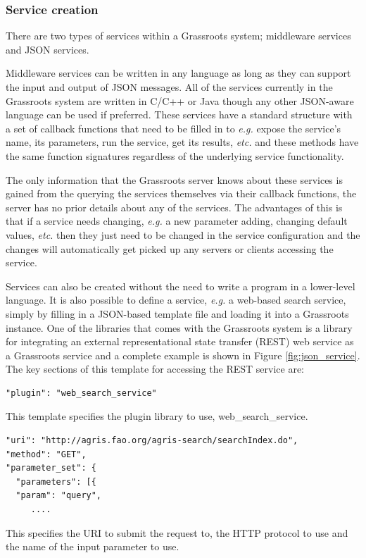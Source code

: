 \documentclass[12pt,a4paper]{extarticle}
\begin{document}
\subsubsection*{Service creation}

There are two types of services within a Grassroots system; middleware services and JSON services.

Middleware services can be written in any language as long as they can support the input and output of JSON messages. 
All of the services currently in the Grassroots system are written in C/C++ or Java though any other JSON-aware language can be used if preferred. 
These services have a standard structure with a set of callback functions that need to be filled in to \textit{e.g.} expose the service's name, its parameters, run the service, get its results, \textit{etc.} and these methods have the same function signatures regardless of the underlying service functionality. 

The only information that the Grassroots server knows about these services is gained from the querying the services themselves via their callback functions, the server has no prior details about any of the services. 
The advantages of this is that if a service needs changing, \textit{e.g.} a new parameter adding, changing default values, \textit{etc.} then they just need to be changed in the service configuration and the changes will automatically get picked up any servers or clients accessing the service. 

Services can also be created without the need to write a program in a lower-level language. 
It is also possible to define a service, \textit{e.g.} a web-based search service, simply by filling in a JSON-based template file and loading it into a Grassroots instance. 
One of the libraries that comes with the Grassroots system is a library for integrating an external representational state transfer (REST) web service as a Grassroots service and a complete example is shown in Figure \ref{fig:json_service}. 
The key sections of this template for accessing the REST service are:

\begin{lstlisting}[style=json]
"plugin": "web_search_service"
\end{lstlisting}
This template specifies the plugin library to use, web\_search\_service.

\begin{lstlisting}[style=json]
"uri": "http://agris.fao.org/agris-search/searchIndex.do",
"method": "GET",
"parameter_set": {
  "parameters": [{
  "param": "query",
     ....
\end{lstlisting}
This specifies the URI to submit the request to, the HTTP protocol to use and the name of the input parameter to use.
\end{document}
